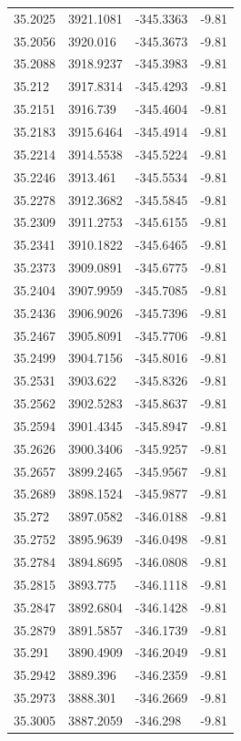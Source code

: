 \begin{table}[H]
\begin{tabular}{llll}
35.2025 & 3921.1081 & -345.3363 & -9.81 \\
35.2056 & 3920.016 & -345.3673 & -9.81 \\
35.2088 & 3918.9237 & -345.3983 & -9.81 \\
35.212 & 3917.8314 & -345.4293 & -9.81 \\
35.2151 & 3916.739 & -345.4604 & -9.81 \\
35.2183 & 3915.6464 & -345.4914 & -9.81 \\
35.2214 & 3914.5538 & -345.5224 & -9.81 \\
35.2246 & 3913.461 & -345.5534 & -9.81 \\
35.2278 & 3912.3682 & -345.5845 & -9.81 \\
35.2309 & 3911.2753 & -345.6155 & -9.81 \\
35.2341 & 3910.1822 & -345.6465 & -9.81 \\
35.2373 & 3909.0891 & -345.6775 & -9.81 \\
35.2404 & 3907.9959 & -345.7085 & -9.81 \\
35.2436 & 3906.9026 & -345.7396 & -9.81 \\
35.2467 & 3905.8091 & -345.7706 & -9.81 \\
35.2499 & 3904.7156 & -345.8016 & -9.81 \\
35.2531 & 3903.622 & -345.8326 & -9.81 \\
35.2562 & 3902.5283 & -345.8637 & -9.81 \\
35.2594 & 3901.4345 & -345.8947 & -9.81 \\
35.2626 & 3900.3406 & -345.9257 & -9.81 \\
35.2657 & 3899.2465 & -345.9567 & -9.81 \\
35.2689 & 3898.1524 & -345.9877 & -9.81 \\
35.272 & 3897.0582 & -346.0188 & -9.81 \\
35.2752 & 3895.9639 & -346.0498 & -9.81 \\
35.2784 & 3894.8695 & -346.0808 & -9.81 \\
35.2815 & 3893.775 & -346.1118 & -9.81 \\
35.2847 & 3892.6804 & -346.1428 & -9.81 \\
35.2879 & 3891.5857 & -346.1739 & -9.81 \\
35.291 & 3890.4909 & -346.2049 & -9.81 \\
35.2942 & 3889.396 & -346.2359 & -9.81 \\
35.2973 & 3888.301 & -346.2669 & -9.81 \\
35.3005 & 3887.2059 & -346.298 & -9.81 \\

\end{tabular}
\end{table}
